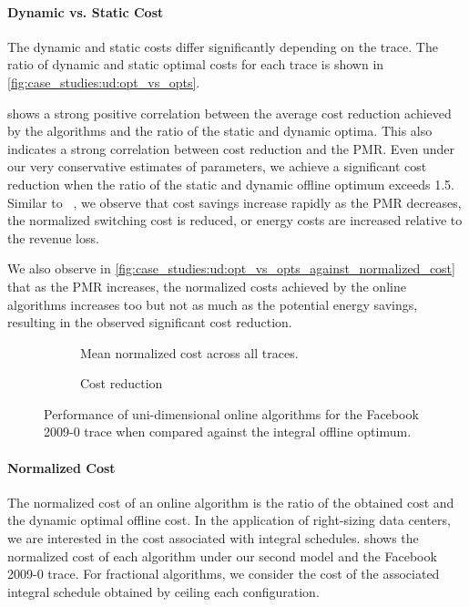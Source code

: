 \paragraph{Dynamic vs. Static Cost} The dynamic and static costs differ significantly depending on the trace. The ratio of dynamic and static optimal costs for each trace is shown in \cref{fig:case_studies:ud:opt_vs_opts}.

 shows a strong positive correlation between the average cost reduction achieved by the algorithms and the ratio of the static and dynamic optima. This also indicates a strong correlation between cost reduction and the PMR. Even under our very conservative estimates of parameters, we achieve a significant cost reduction when the ratio of the static and dynamic offline optimum exceeds 1.5. Similar to \citeauthor*{Lin2011}~\cite{Lin2011}, we observe that cost savings increase rapidly as the PMR decreases, the normalized switching cost is reduced, or energy costs are increased relative to the revenue loss.

We also observe in \cref{fig:case_studies:ud:opt_vs_opts_against_normalized_cost} that as the PMR increases, the normalized costs achieved by the online algorithms increases too but not as much as the potential energy savings, resulting in the observed significant cost reduction.

\begin{figure}
    \begin{subfigure}[b]{.5\linewidth}
    \resizebox{\textwidth}{!}{}
    \caption{Mean normalized cost across all traces.}\label{fig:case_studies:ud:normalized_cost}
    \end{subfigure}
    \begin{subfigure}[b]{.5\linewidth}
    \resizebox{\textwidth}{!}{}
    \caption{Cost reduction}\label{fig:case_studies:ud:cost_reduction}
    \end{subfigure}
    \caption{Performance of uni-dimensional online algorithms for the Facebook 2009-0 trace when compared against the integral offline optimum.}
\end{figure}

\paragraph{Normalized Cost} The normalized cost of an online algorithm is the ratio of the obtained cost and the dynamic optimal offline cost. In the application of right-sizing data centers, we are interested in the cost associated with integral schedules.  shows the normalized cost of each algorithm under our second model and the Facebook 2009-0 trace. For fractional algorithms, we consider the cost of the associated integral schedule obtained by ceiling each configuration.

